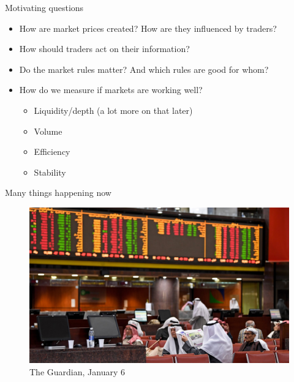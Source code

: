 \documentclass[english,10pt]{beamer}
\theoremstyle{definition}
\begin{document}
\begin{frame}{Motivating questions}
\begin{itemize}
	\item How are market prices created? How are they influenced by traders?
	\item How should traders act on their information?
	\item Do the market rules matter? And which rules are good for whom?
	\item How do we measure if markets are working well?
	\begin{itemize}
		\item Liquidity/depth (a lot more on that later)
		\item Volume
		\item Efficiency
		\item Stability
	\end{itemize}
\end{itemize}
\end{frame}


\begin{frame}{Many things happening now}
\begin{figure}
	\includegraphics[width=.8\linewidth]{pics/markets2020}
	\caption{The Guardian, January 6}
\end{figure}
\end{frame}
\end{document}
